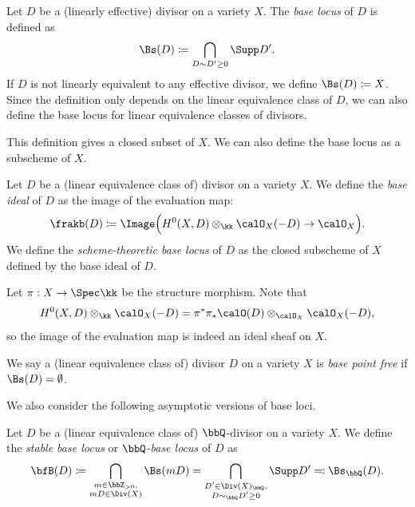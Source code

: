   \begin{definition}
    Let $D$ be a (linearly effective) divisor on a variety $X$.
    The \emph{base locus} of $D$ is defined as
    \[ \Bs(D) \coloneqq \bigcap_{D \sim D' \geq 0} \Supp D'. \]
    If $D$ is not linearly equivalent to any effective divisor, we define $\Bs(D) \coloneqq X$.
    Since the definition only depends on the linear equivalence class of $D$, we can also define the base locus for linear equivalence classes of divisors.
  \end{definition}

  This definition gives a closed subset of $X$.
  We can also define the base locus as a subscheme of $X$.


  \begin{definition}
    Let $D$ be a (linear equivalence class of) divisor on a variety $X$.
    We define the \emph{base ideal} of $D$ as the image of the evaluation map:
    \[ \frakb(D) \coloneqq \Image\Bigl( H^0(X, D) \otimes_\kk \calO_X(-D) \to \calO_X \Bigr). \]
    We define the \emph{scheme-theoretic base locus} of $D$ as the closed subscheme of $X$ defined by the base ideal of $D$.
  \end{definition}

  Let $\pi: X \to \Spec \kk$ be the structure morphism.
  Note that 
  \[ H^0(X, D) \otimes_\kk \calO_X(-D) = \pi^*\pi_*\calO(D) \otimes_{\calO_X} \calO_X(-D), \]
  so the image of the evaluation map is indeed an ideal sheaf on $X$.

  \begin{definition}
    We say a (linear equivalence class of) divisor $D$ on a variety $X$ is \emph{base point free} if $\Bs(D) = \emptyset$.
  \end{definition}

  We also consider the following asymptotic versions of base loci.
  \begin{definition}
    Let $D$ be a (linear equivalence class of) $\bbQ$-divisor on a variety $X$.
    We define the \emph{stable base locus} or \emph{$\bbQ$-base locus} of $D$ as
    \[ \bfB(D) \coloneqq \bigcap_{\substack{m \in \bbZ_{>0},\\ mD \in \Div(X)}} \Bs(mD) = \bigcap_{\substack{D' \in \Div(X)_\bbQ, \\ D \sim_\bbQ D'\geq 0}} \Supp D' \eqqcolon \Bs_\bbQ(D). \]
  \end{definition}

